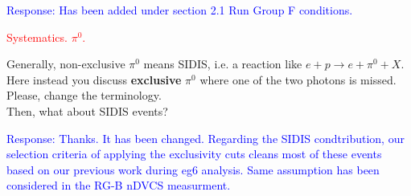 \begin{itemize}
  \textcolor{blue}{Response: Has been added under section 2.1 Run Group F 
  conditions.}


  \textcolor{red}{
  \item Systematics. $\pi^0$.  }
  \newline
 
 Generally, non-exclusive $\pi^0$ means SIDIS, i.e. a reaction like 
 $e+p\rightarrow e+\pi^0+X$. Here instead you discuss \textbf{exclusive} 
 $\pi^0$ where one of the two photons is missed. Please, change the 
 terminology. \\ Then, what about SIDIS events?
  
  
  \textcolor{blue}{Response: Thanks. It has been changed. Regarding the SIDIS 
  condtribution, our selection criteria of applying the exclusivity cuts cleans 
  most of these events based on our previous work during eg6 analysis. Same 
  assumption has been considered in the RG-B nDVCS measurment.}
  
 \end{itemize}
